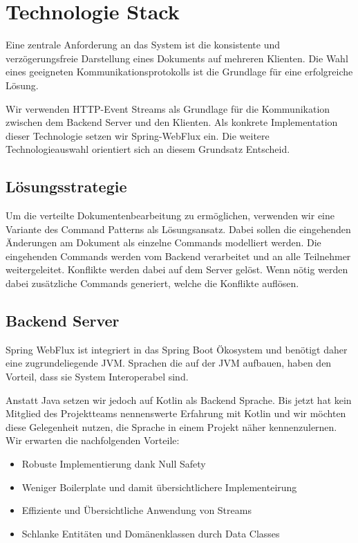 \section{Technologie Stack}

Eine zentrale Anforderung an das System ist die konsistente und verzögerungsfreie Darstellung eines Dokuments auf mehreren Klienten.
Die Wahl eines geeigneten Kommunikationsprotokolls ist die Grundlage für eine erfolgreiche Lösung.

Wir verwenden HTTP-Event Streams als Grundlage für die Kommunikation zwischen dem Backend Server und den Klienten.
Als konkrete Implementation dieser Technologie setzen wir Spring-WebFlux ein.
Die weitere Technologieauswahl orientiert sich an diesem Grundsatz Entscheid.

\subsection{Lösungsstrategie}
Um die verteilte Dokumentenbearbeitung zu ermöglichen, verwenden wir eine Variante des Command Patterns als Lösungsansatz.
Dabei sollen die eingehenden Änderungen am Dokument als einzelne Commands modelliert werden.
Die eingehenden Commands werden vom Backend verarbeitet und an alle Teilnehmer weitergeleitet.
Konflikte werden dabei auf dem Server gelöst.
Wenn nötig werden dabei zusätzliche Commands generiert, welche die Konflikte auflösen.


\subsection{Backend Server}
Spring WebFlux ist integriert in das Spring Boot Ökosystem und benötigt daher eine zugrundeliegende JVM\@.
Sprachen die auf der JVM aufbauen, haben den Vorteil, dass sie System Interoperabel sind.

Anstatt Java setzen wir jedoch auf Kotlin als Backend Sprache.
Bis jetzt hat kein Mitglied des Projektteams nennenswerte Erfahrung mit Kotlin und wir möchten diese Gelegenheit nutzen,
die Sprache in einem Projekt näher kennenzulernen.
Wir erwarten die nachfolgenden Vorteile: 

\begin{itemize}
    \item Robuste Implementierung dank Null Safety
    \item Weniger Boilerplate und damit übersichtlichere Implementeirung
    \item Effiziente und Übersichtliche Anwendung von Streams
    \item Schlanke Entitäten und Domänenklassen durch Data Classes
\end{itemize}



